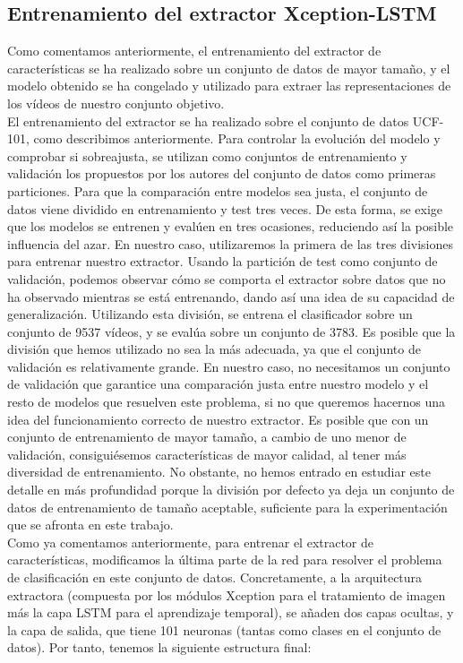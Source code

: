 \documentclass[../main.tex]{memoir}
\begin{document}
\subsection{Entrenamiento del extractor Xception-LSTM}

Como comentamos anteriormente, el entrenamiento del extractor de
características se ha realizado sobre un conjunto de datos de mayor
tamaño, y el modelo obtenido se ha congelado y utilizado para extraer
las representaciones de los vídeos de nuestro conjunto objetivo.\\

El entrenamiento del extractor se ha realizado sobre el conjunto de
datos UCF-101, como describimos anteriormente. Para controlar la
evolución del modelo y comprobar si sobreajusta, se utilizan como
conjuntos de entrenamiento y validación los propuestos por los autores
del conjunto de datos como primeras particiones. Para que la
comparación entre modelos sea justa, el conjunto de datos viene
dividido en entrenamiento y test tres veces. De esta forma, se exige
que los modelos se entrenen y evalúen en tres ocasiones, reduciendo
así la posible influencia del azar. En nuestro caso, utilizaremos la
primera de las tres divisiones para entrenar nuestro extractor. Usando
la partición de test como conjunto de validación, podemos observar
cómo se comporta el extractor sobre datos que no ha observado mientras
se está entrenando, dando así una idea de su capacidad de
generalización. Utilizando esta división, se entrena el clasificador
sobre un conjunto de 9537 vídeos, y se evalúa sobre un conjunto de
3783. Es posible que la división que hemos utilizado no sea la más
adecuada, ya que el conjunto de validación es relativamente grande. En
nuestro caso, no necesitamos un conjunto de validación que garantice
una comparación justa entre nuestro modelo y el resto de modelos que
resuelven este problema, si no que queremos hacernos una idea del
funcionamiento correcto de nuestro extractor. Es posible que con un
conjunto de entrenamiento de mayor tamaño, a cambio de uno menor de
validación, consiguiésemos características de mayor calidad, al tener
más diversidad de entrenamiento. No obstante, no hemos entrado en
estudiar este detalle en más profundidad porque la división por defecto
ya deja un conjunto de datos de entrenamiento de tamaño aceptable,
suficiente para la experimentación que se afronta en este trabajo.\\

Como ya comentamos anteriormente, para entrenar el extractor de
características, modificamos la última parte de la red para resolver
el problema de clasificación en este conjunto de datos. Concretamente,
a la arquitectura extractora (compuesta por los módulos Xception para
el tratamiento de imagen más la capa LSTM para el aprendizaje
temporal), se añaden dos capas ocultas, y la capa de salida, que tiene
101 neuronas (tantas como clases en el conjunto de datos). Por tanto,
tenemos la siguiente estructura final:
\end{document}
